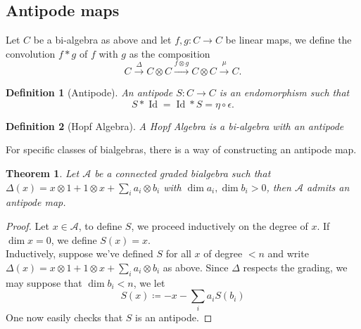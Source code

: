 \documentclass[11pt, a4paper]{article}
\DeclareMathOperator*{\id}{Id}
\newtheorem{thm}{Theorem}
\newtheorem{defn}{Definition}
\theoremstyle{plain}
\newtheorem*{proof}{Proof}
\begin{document}
\subsection{Antipode maps}
Let $C$ be a bi-algebra as above and let $f,g\colon C\to C$ be linear maps, we define the convolution $f\ast g$ of $f$ with $g$ as the composition
\[ 
	C \xrightarrow{\Delta} C\otimes C \xrightarrow{f\otimes g} C\otimes C \xrightarrow{\mu} C.
\]
\begin{defn}[Antipode]
	An antipode $S\colon C\to C$ is an endomorphism such that
	\[ 
	S\ast \id = \id\ast S = \eta\circ \epsilon.
	\]
\end{defn}
\begin{defn}[Hopf Algebra]
A Hopf Algebra is a bi-algebra with an antipode
\end{defn}
For specific classes of bialgebras, there is a way of constructing an antipode map.
\begin{thm}
Let $\mathcal{A}$ be a connected graded bialgebra such that $\Delta( x) = x\otimes 1 + 1 \otimes x + \sum_i a_i \otimes b_i $ with $\dim a_i,\dim b_i >0$, then $\mathcal{A}$ admits an antipode map.
\end{thm}
\begin{proof}
Let $x \in \mathcal{A}$, to define $S$, we proceed inductively on the degree of $x$. If $\dim x = 0$, we define $S( x) = x$.\\
Inductively, suppose we've defined $S$ for all $x$ of degree $<n$ and write $\Delta( x) = x\otimes 1 + 1 \otimes x + \sum_i a_i \otimes b_i$ as above. Since $\Delta$ respects the grading, we may suppose that $\dim b_i <n$, we let
\[ 
S( x) \coloneq -x - \sum_i a_i S( b_i) 
\]
One now easily checks that $S$ is an antipode.
\end{proof}



\end{document}
